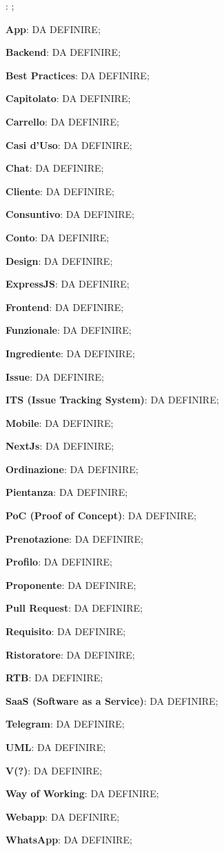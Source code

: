 \item \textbf{}: ;
\item \textbf{App}: DA DEFINIRE;
\item \textbf{Backend}: DA DEFINIRE;
\item \textbf{Best Practices}: DA DEFINIRE;
\item \textbf{Capitolato}: DA DEFINIRE;
\item \textbf{Carrello}: DA DEFINIRE;
\item \textbf{Casi d'Uso}: DA DEFINIRE;
\item \textbf{Chat}: DA DEFINIRE;
\item \textbf{Cliente}: DA DEFINIRE;
\item \textbf{Consuntivo}: DA DEFINIRE;
\item \textbf{Conto}: DA DEFINIRE;
\item \textbf{Design}: DA DEFINIRE;
\item \textbf{ExpressJS}: DA DEFINIRE;
\item \textbf{Frontend}: DA DEFINIRE;
\item \textbf{Funzionale}: DA DEFINIRE;
\item \textbf{Ingrediente}: DA DEFINIRE;
\item \textbf{Issue}: DA DEFINIRE;
\item \textbf{ITS (Issue Tracking System)}: DA DEFINIRE;
\item \textbf{Mobile}: DA DEFINIRE;
\item \textbf{NextJs}: DA DEFINIRE;
\item \textbf{Ordinazione}: DA DEFINIRE;
\item \textbf{Pientanza}: DA DEFINIRE;
\item \textbf{PoC (Proof of Concept)}: DA DEFINIRE;
\item \textbf{Prenotazione}: DA DEFINIRE;
\item \textbf{Profilo}: DA DEFINIRE;
\item \textbf{Proponente}: DA DEFINIRE;
\item \textbf{Pull Request}: DA DEFINIRE;
\item \textbf{Requisito}: DA DEFINIRE;
\item \textbf{Ristoratore}: DA DEFINIRE;
\item \textbf{RTB}: DA DEFINIRE;
\item \textbf{SaaS (Software as a Service)}: DA DEFINIRE;
\item \textbf{Telegram}: DA DEFINIRE;
\item \textbf{UML}: DA DEFINIRE;
\item \textbf{V(?)}: DA DEFINIRE;
\item \textbf{Way of Working}: DA DEFINIRE;
\item \textbf{Webapp}: DA DEFINIRE;
\item \textbf{WhatsApp}: DA DEFINIRE;
